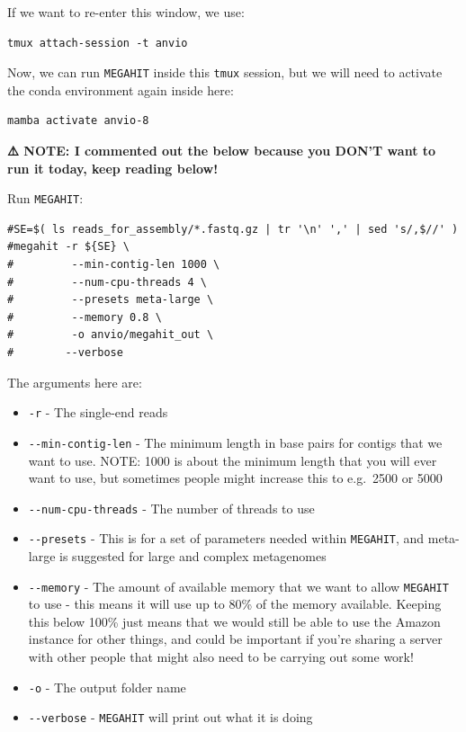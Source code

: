 \documentclass[
]{book}
\providecommand{\tightlist}{%
  \setlength{\itemsep}{0pt}\setlength{\parskip}{0pt}}
\begin{document}
If we want to re-enter this window, we use:

\begin{verbatim}
tmux attach-session -t anvio
\end{verbatim}

Now, we can run \texttt{MEGAHIT} inside this \texttt{tmux} session, but we will need to activate the conda environment again inside here:

\begin{verbatim}
mamba activate anvio-8
\end{verbatim}

\textbf{⚠️ NOTE: I commented out the below because you DON'T want to run it today, keep reading below!}

Run \texttt{MEGAHIT}:

\begin{verbatim}
#SE=$( ls reads_for_assembly/*.fastq.gz | tr '\n' ',' | sed 's/,$//' )
#megahit -r ${SE} \
#         --min-contig-len 1000 \
#         --num-cpu-threads 4 \
#         --presets meta-large \
#         --memory 0.8 \
#         -o anvio/megahit_out \
#        --verbose
\end{verbatim}

The arguments here are:

\begin{itemize}
\tightlist
\item
  \texttt{-r} - The single-end reads
\item
  \texttt{-\/-min-contig-len} - The minimum length in base pairs for contigs that we want to use. NOTE: 1000 is about the minimum length that you will ever want to use, but sometimes people might increase this to e.g.~2500 or 5000
\item
  \texttt{-\/-num-cpu-threads} - The number of threads to use
\item
  \texttt{-\/-presets} - This is for a set of parameters needed within \texttt{MEGAHIT}, and meta-large is suggested for large and complex metagenomes
\item
  \texttt{-\/-memory} - The amount of available memory that we want to allow \texttt{MEGAHIT} to use - this means it will use up to 80\% of the memory available. Keeping this below 100\% just means that we would still be able to use the Amazon instance for other things, and could be important if you're sharing a server with other people that might also need to be carrying out some work!
\item
  \texttt{-o} - The output folder name
\item
  \texttt{-\/-verbose} - \texttt{MEGAHIT} will print out what it is doing
\end{itemize}
\end{document}
